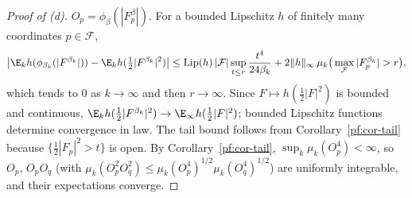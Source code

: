 \begin{proof}[Proof of (d)]
$O_p=\phi_{\beta}(|F^\beta_p|)$. For a bounded Lipschitz $h$ of finitely many coordinates $p\in\mathcal F$,
\[
\big|\E_kh(\phi_{\beta_k}(|F^{\beta_k}|))-\E_kh(\tfrac12|F^{\beta_k}|^2)\big|\le\mathrm{Lip}(h)\,|\mathcal F|\sup_{t\le r}\frac{t^4}{24\beta_k}+2\|h\|_\infty\,\mu_k\big(\max_{\mathcal F}|F^{\beta_k}_p|>r\big),
\]
which tends to $0$ as $k\to\infty$ and then $r\to\infty$. Since $F\mapsto h(\tfrac12|F|^2)$ is bounded and continuous, $\E_kh(\tfrac12|F^{\beta_k}|^2)\to\E_\infty h(\tfrac12|F|^2)$; bounded Lipschitz functions determine convergence in law. The tail bound follows from Corollary~\ref{pf:cor-tail} because $\{\tfrac12|F_p|^2>t\}$ is open. By Corollary~\ref{pf:cor-tail}, $\sup_k\mu_k(O_p^4)<\infty$, so $O_p$, $O_pO_q$ (with $\mu_k(O_p^2O_q^2)\le\mu_k(O_p^4)^{1/2}\mu_k(O_q^4)^{1/2}$) are uniformly integrable, and their expectations converge.
\end{proof}

